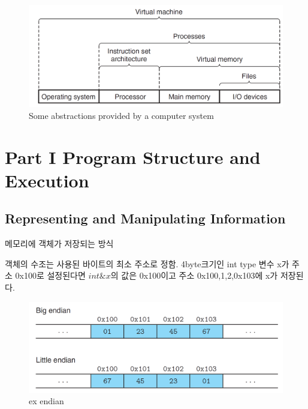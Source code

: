 \documentclass[chapter,oneside]{oblivoir}
\begin{document}
\begin{figure}[h!]
    \centering
    \includegraphics[scale=0.3]{pic/pic10.png}
    \caption{Some abstractions provided by a computer system}
\end{figure}


\part{Part I Program Structure and Execution}

\chapter{Representing and Manipulating Information}


메모리에 객체가 저장되는 방식

객체의 수조는 사용된 바이트의 최소 주소로 정함.
4byte크기인 int type 변수 x가 주소 0x100로 설정된다면 $int \&x$의 값은 0x100이고 주소 0x100,1,2,0x103에 x가 저장된다.






\begin{figure}[h!]
    \centering
    \includegraphics[scale=0.3]{pic/pic11.png}
    \caption{ex endian}
\end{figure}
\end{document}
